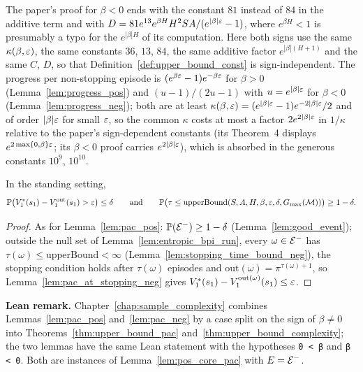 \begin{remark}\label{rem:neg_constants_final}
The paper's proof for $\beta < 0$ ends with the constant $81$ instead of $84$ in the additive term
and with $D = 81e^{13}e^{\beta H}H^2SA/(e^{|\beta|\varepsilon} - 1)$, where $e^{\beta H} < 1$ is presumably a typo
for the $e^{|\beta|H}$ of its computation. Here both signs use the same $\kappa(\beta,\varepsilon)$, the same
constants $36$, $13$, $84$, the same additive factor $e^{|\beta|(H+1)}$ and the same $C$, $D$, so that
Definition~\ref{def:upper_bound_const} is sign-independent. The progress per non-stopping
episode is $(e^{\beta\varepsilon} - 1)e^{-\beta\varepsilon}$ for $\beta > 0$ (Lemma~\ref{lem:progress_pos}) and
$(u - 1)/(2u - 1)$ with $u = e^{|\beta|\varepsilon}$ for $\beta < 0$ (Lemma~\ref{lem:progress_neg}); both are at
least $\kappa(\beta, \varepsilon) = (e^{|\beta|\varepsilon} - 1)e^{-2|\beta|\varepsilon}/2$ and of order $|\beta|\varepsilon$ for small $\varepsilon$, so
the common $\kappa$ costs at most a factor $2e^{2|\beta|\varepsilon}$ in $1/\kappa$ relative to the paper's
sign-dependent constants (its Theorem~4 displays $e^{2\max\{0,\beta\}\varepsilon}$; its $\beta < 0$ proof carries
$e^{2|\beta|\varepsilon}$), which is absorbed in the generous constants $10^9$, $10^{10}$.
\end{remark}

\begin{lemma}\label{lem:pac_neg}
\leanok
{}
In the standing setting,
\[
  \mathbb{P}\big(V^*_1(s_1) - V^{\mathrm{out}}_1(s_1) > \varepsilon\big) \le \delta
  \qquad\text{and}\qquad
  \mathbb{P}\big(\tau \le \mathrm{upperBound}(S,A,H,\beta,\varepsilon,\delta,G_{\max}(\mathcal M))\big) \ge 1 - \delta .
\]
\end{lemma}

\begin{proof}
\leanok
As for Lemma~\ref{lem:pac_pos}: $\mathbb{P}(\mathcal{E}^-) \ge 1 - \delta$ (Lemma~\ref{lem:good_event}); outside the
null set of Lemma~\ref{lem:entropic_bpi_run}, every $\omega \in \mathcal{E}^-$ has $\tau(\omega) \le \mathrm{upperBound} < \infty$
(Lemma~\ref{lem:stopping_time_bound_neg}), the stopping condition holds after $\tau(\omega)$ episodes
and $\mathrm{out}(\omega) = \pi^{\tau(\omega)+1}$, so Lemma~\ref{lem:pac_at_stopping_neg} gives
$V^*_1(s_1) - V^{\mathrm{out}(\omega)}_1(s_1) \le \varepsilon$.
\end{proof}

\textbf{Lean remark.} Chapter~\ref{chap:sample_complexity} combines Lemmas~\ref{lem:pac_pos}
and~\ref{lem:pac_neg} by a case split on the sign of $\beta \ne 0$ into
Theorems~\ref{thm:upper_bound_pac} and~\ref{thm:upper_bound_complexity}; the two lemmas have the
same Lean statement with the hypotheses \texttt{0 < β} and \texttt{β < 0}. Both are instances of
Lemma~\ref{lem:pos_core_pac} with $E = \mathcal{E}^-$.
